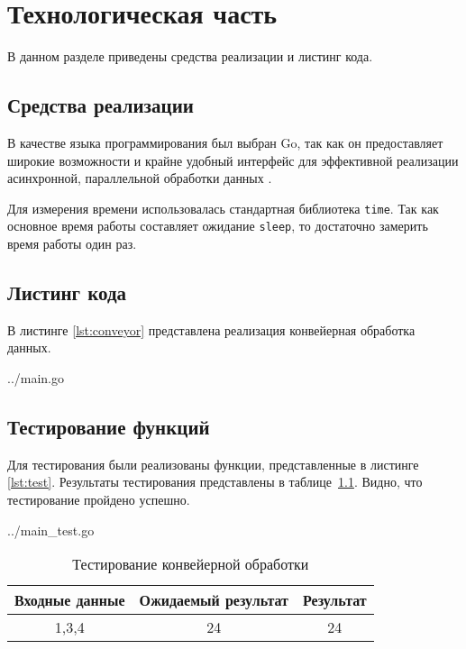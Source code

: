 \documentclass[a4paper,14pt]{extreport}
\newcommand{\code}[1]{\texttt{#1}}
\begin{document}
\chapter{Технологическая часть}

В данном разделе приведены средства реализации и листинг кода.

\section{Средства реализации}

В качестве языка программирования был выбран Go, так как он предоставляет широкие возможности и крайне удобный интерфейс для эффективной реализации асинхронной, параллельной обработки данных \cite{go}.

Для измерения времени использовалась стандартная библиотека \code{time}.
Так как основное время работы составляет ожидание \code{sleep}, то достаточно замерить время работы один раз.

\section{Листинг кода}

В листинге \ref{lst:conveyor} представлена реализация конвейерная обработка данных.

\begin{lstinputlisting}[
	caption={Алгоритм сортировки пузырьком},
	label={lst:conveyor},
	style={go}
	]{../main.go}
\end{lstinputlisting}

\section{Тестирование функций}

Для тестирования были реализованы функции, представленные в листинге \ref{lst:test}.
Результаты тестирования представлены в таблице~\ref{tbl:test}. Видно, что тестирование пройдено успешно.

\begin{lstinputlisting}[
	caption={Тестовые задачи},
	label={lst:test},
	style={go},
	linerange={12-27}
	]{../main_test.go}
\end{lstinputlisting}

\begin{table}[h!]
	\begin{center}
		\begin{tabular}{|c|c|c|}
			\hline
			Входные данные & Ожидаемый результат & Результат \\ 
			\hline
			1,3,4 & 24  & 24\\
			\hline
		\end{tabular}
		\caption{\label{tbl:test}Тестирование конвейерной обработки}
	\end{center}
\end{table}
\end{document}
